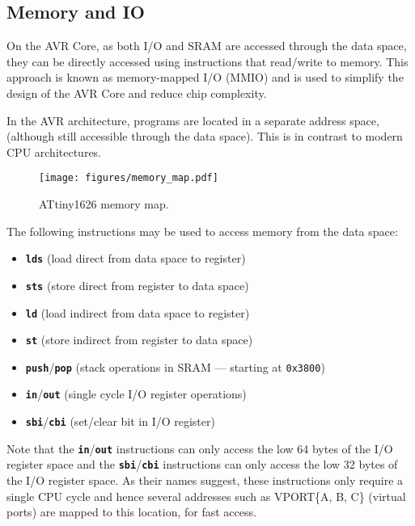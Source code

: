 \documentclass{article}
\newcommand{\keywordinline}[1]{\textcolor[rgb]{0.00,0.50,0.00}{\textbf{\texttt{#1}}}}
\begin{document}
\subsection{Memory and IO}
On the AVR Core, as both I/O and SRAM are accessed through the data
space, they can be directly accessed using instructions that read/write
to memory. This approach is known as memory-mapped I/O (MMIO) and is
used to simplify the design of the AVR Core and reduce chip complexity.

In the AVR architecture, programs are located in a separate address
space, (although still accessible through the data space). This is in
contrast to modern CPU architectures.
\begin{figure}[H]
    \centering
    \texttt{[image: figures/memory\_map.pdf]}
    \caption{ATtiny1626 memory map.} %
\end{figure}
The following instructions may be used to access memory from the data space:
\begin{itemize}
    \item \keywordinline{lds} (load direct from data space to register)
    \item \keywordinline{sts} (store direct from register to data space)
    \item \keywordinline{ld} (load indirect from data space to register)
    \item \keywordinline{st} (store indirect from register to data space)
    \item \keywordinline{push}/\keywordinline{pop} (stack operations in SRAM --- starting at \texttt{0x3800})
    \item \keywordinline{in}/\keywordinline{out} (single cycle I/O register operations)
    \item \keywordinline{sbi}/\keywordinline{cbi} (set/clear bit in I/O register)
\end{itemize}
Note that the \keywordinline{in}/\keywordinline{out} instructions can
only access the low 64 bytes of the I/O register space and the \keywordinline{sbi}/\keywordinline{cbi}
instructions can only access the low 32 bytes of the I/O register space.
As their names suggest, these instructions only require a single CPU
cycle and hence several addresses such as VPORT\{A, B, C\} (virtual
ports) are mapped to this location, for fast access.
\end{document}
